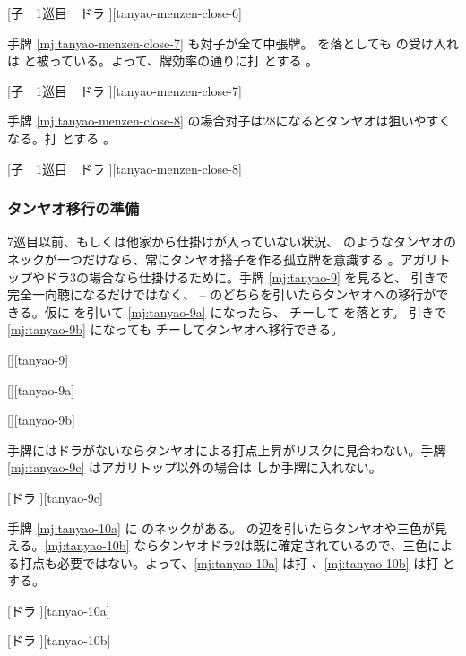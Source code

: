 \documentclass[../nankiru_main.tex]{subfiles}
\begin{document}
[子　1巡目　ドラ ][tanyao-menzen-close-6]

手牌 \ref{mj:tanyao-menzen-close-7} も対子が全て中張牌。 を落としても  の受け入れは  と被っている。よって、牌効率の通りに打  とする \citep[][pp.~59--60]{kawamura-naki}。

[子　1巡目　ドラ ][tanyao-menzen-close-7]

手牌 \ref{mj:tanyao-menzen-close-8} の場合対子は28になるとタンヤオは狙いやすくなる。打  とする \citep[][pp.~59--60]{kawamura-naki}。

[子　1巡目　ドラ ][tanyao-menzen-close-8]


\subsubsection*{タンヤオ移行の準備}

7巡目以前、もしくは他家から仕掛けが入っていない状況、 のようなタンヤオのネックが一つだけなら、常にタンヤオ搭子を作る孤立牌を意識する \citep[][pp.~155--158]{kawamura-naki}。アガリトップやドラ3の場合なら仕掛けるために。手牌 \ref{mj:tanyao-9} を見ると、 引きで完全一向聴になるだけではなく、 --   のどちらを引いたらタンヤオへの移行ができる。仮に  を引いて \ref{mj:tanyao-9a} になったら、 チーして  を落とす。 引きで \ref{mj:tanyao-9b} になっても  チーしてタンヤオへ移行できる。

[][tanyao-9]

[][tanyao-9a]

[][tanyao-9b]

手牌にはドラがないならタンヤオによる打点上昇がリスクに見合わない。手牌 \ref{mj:tanyao-9c} はアガリトップ以外の場合は  しか手牌に入れない。

[ドラ ][tanyao-9c]

手牌 \ref{mj:tanyao-10a} に  のネックがある。 の辺を引いたらタンヤオや三色が見える。\ref{mj:tanyao-10b} ならタンヤオドラ2は既に確定されているので、三色による打点も必要ではない。よって、\ref{mj:tanyao-10a} は打 、\ref{mj:tanyao-10b} は打  とする。

[ドラ ][tanyao-10a]

[ドラ ][tanyao-10b]
\end{document}

